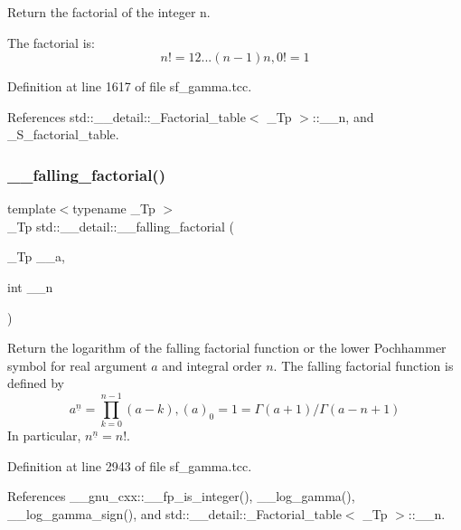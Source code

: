 Return the factorial of the integer n. 

The factorial is\+: \[ n! = 1 2 ... (n-1) n, 0! = 1 \] 

Definition at line 1617 of file sf\+\_\+gamma.\+tcc.



References std\+::\+\_\+\+\_\+detail\+::\+\_\+\+Factorial\+\_\+table$<$ \+\_\+\+Tp $>$\+::\+\_\+\+\_\+n, and \+\_\+\+S\+\_\+factorial\+\_\+table.

\mbox{\label{namespacestd_1_1____detail_a62ddf0f8d9467f4c3f2cc0b500ca1272}} 
\subsubsection{\texorpdfstring{\+\_\+\+\_\+falling\+\_\+factorial()}{\_\_falling\_factorial()}\hspace{0.1cm}{\footnotesize\ttfamily [1/2]}}
{\footnotesize\ttfamily template$<$typename \+\_\+\+Tp $>$ \\
\+\_\+\+Tp std\+::\+\_\+\+\_\+detail\+::\+\_\+\+\_\+falling\+\_\+factorial (\begin{DoxyParamCaption}\item[{\+\_\+\+Tp}]{\+\_\+\+\_\+a,  }\item[{int}]{\+\_\+\+\_\+n }\end{DoxyParamCaption})}



Return the logarithm of the falling factorial function or the lower Pochhammer symbol for real argument $ a $ and integral order $ n $. The falling factorial function is defined by \[ a^{\underline{n}} = \prod_{k=0}^{n-1} (a - k), (a)_0 = 1 = \Gamma(a + 1) / \Gamma(a - n + 1) \] In particular, $ n^{\underline{n}} = n! $. 



Definition at line 2943 of file sf\+\_\+gamma.\+tcc.



References \+\_\+\+\_\+gnu\+\_\+cxx\+::\+\_\+\+\_\+fp\+\_\+is\+\_\+integer(), \+\_\+\+\_\+log\+\_\+gamma(), \+\_\+\+\_\+log\+\_\+gamma\+\_\+sign(), and std\+::\+\_\+\+\_\+detail\+::\+\_\+\+Factorial\+\_\+table$<$ \+\_\+\+Tp $>$\+::\+\_\+\+\_\+n.



